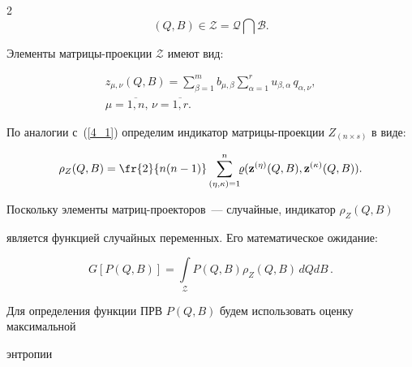 \begin{multicols}{2}
\begin{equation*}




(Q,B) \in \mathcal{Z} = \mathcal{Q} \bigcap \mathcal{B}.


\end{equation*}


Элементы матрицы-проекции $\mathcal{Z}$ имеют вид:


\begin{multline*}


\label{4_5}


z_{\mu,\nu}(Q,B) = \sum\limits^m_{\beta=1} b_{\mu,\beta} 


\sum\limits^r_{\alpha=1} u_{\beta,\alpha}\,q_{\alpha,\nu},\\ \mu = 


\overline{1,n},\,\nu = \overline{1,r}.


\end{multline*}


По аналогии с~(\ref{4_1}) определим индикатор мат\-ри\-цы-про\-ек\-ции $Z_{(n 


\times s)}$ в виде:


\begin{equation*}




\rho_Z(Q,B) = \fr{2}{n(n-1)}\sum\limits^n_{(\eta, 


\kappa)=1}\!\!\varrho(\mathbf{z}^{(\eta)}(Q,B), \mathbf{z}^{(\kappa)}(Q,B)).


\end{equation*}


Поскольку элементы мат\-риц-про\-ек\-то\-ров~--- случайные, индикатор $\rho_Z(Q,B)$ 


является функцией случайных переменных. Его математическое ожидание:


\begin{equation*}




G[P(Q,B)] = \int\limits_{\mathcal{Z}} P(Q,B) \rho_Z(Q,B)\,dQ dB\,.


\end{equation*}





Для определения функции ПРВ $P(Q,B)$ будем использовать оценку максимальной 


энтропии~\cite{Popkov_2020_dan}


\begin{multline}



\end{multline}
\end{multicols}
